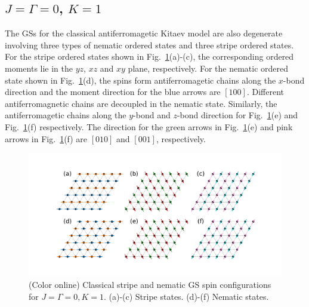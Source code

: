 \documentclass[aps,prb,reprint,amsfonts,amsmath,amssymb,showpacs,groupedaddress,superscriptaddress]{revtex4-1}
\begin{document}
\subsection{$J=\Gamma=0$, $K=1$}

The GSs for the classical antiferromagetic Kitaev model are also degenerate involving three types of nematic ordered states and three stripe ordered states. For the stripe ordered states shown in Fig.~\ref{fig:GSForPositiveK}(a)-(c), the corresponding ordered moments lie in the $yz$, $xz$ and $xy$ plane, respectively. For the nematic ordered state shown in Fig.~\ref{fig:GSForPositiveK}(d), the spins form antiferromagetic chains along the $x$-bond direction and the moment direction for the blue arrows are $[100]$. Different antiferromagnetic chains are decoupled in the nematic state. Similarly, the antiferromagetic chains along the $y$-bond and $z$-bond direction for Fig.~\ref{fig:GSForPositiveK}(e) and Fig.~\ref{fig:GSForPositiveK}(f) respectively. The direction for the green arrows in Fig.~\ref{fig:GSForPositiveK}(e) and pink arrows in Fig.~\ref{fig:GSForPositiveK}(f) are $[010]$ and $[001]$, respectively.
\begin{figure}
    \includegraphics[width=\columnwidth]{fig/SpinConfigForPositiveKitaev.pdf}
    \caption{\label{fig:GSForPositiveK}(Color online) Classical stripe and nematic GS spin configurations for $J=\Gamma=0, K=1$. (a)-(c) Stripe states. (d)-(f) Nematic states.}
\end{figure}


\end{document}
